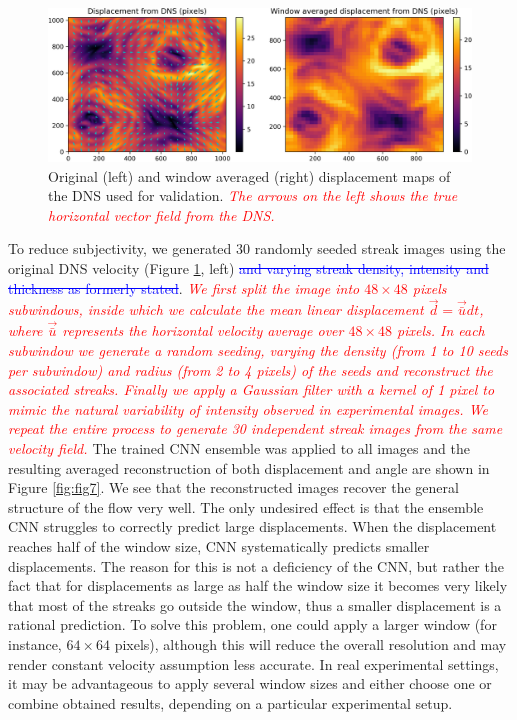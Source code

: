 \documentclass{svjour3}                     %
\newcommand{\new}[1]{\textit{\textcolor{red}{#1}}}
\newcommand{\old}[1]{\textcolor{blue}{\sout{#1}}}
\begin{document}
\begin{figure}
\includegraphics[width=\textwidth]{figs/figure5.png}
\caption{Original (left) and window averaged (right) displacement maps of the DNS \cite{plumley2016effects} used for validation. \new{The arrows on the left shows the true horizontal vector field from the DNS.}}
\label{fig:fig6}
\end{figure}

To reduce subjectivity, we generated 30 randomly seeded streak images using the original DNS velocity (Figure \ref{fig:fig6}, left) \old{and varying streak density, intensity and thickness as formerly stated}. \new{We first split the image into $48\times48$ pixels subwindows, inside which we calculate the mean linear displacement $\vec{d}=\vec{\bar{u}}dt$, where $\vec{\bar{u}}$ represents the horizontal velocity average over $48\times48$ pixels. In each subwindow we generate a random seeding, varying the density (from 1 to 10 seeds per subwindow) and radius (from 2 to 4 pixels) of the seeds and reconstruct the associated streaks. Finally we apply a Gaussian filter with a kernel of 1 pixel to mimic the natural variability of intensity observed in experimental images. We repeat the entire process to generate 30 independent streak images from the same velocity field. }
The trained CNN ensemble was applied to all images and the resulting averaged reconstruction of both displacement and angle are shown in Figure \ref{fig:fig7}. We see that the reconstructed images recover the general structure of the flow very well. The only undesired effect is that the ensemble CNN struggles to correctly predict large displacements. When the displacement reaches half of the window size, CNN systematically predicts smaller displacements. The reason for this is not a deficiency of the CNN, but rather the fact that for displacements as large as half the window size it becomes very likely that most of the streaks go outside the window, thus a smaller displacement is a rational prediction. To solve this problem, one could apply a larger window (for instance, $64\times 64$ pixels), although this will reduce the overall resolution and may render constant velocity assumption less accurate. In real experimental settings, it may be advantageous to apply several window sizes and either choose one or combine obtained results, depending on a particular experimental setup.
\end{document}
